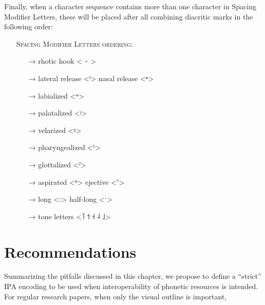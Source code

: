 Finally, when a character sequence contains more than one character in Spacing
Modifier Letters, these will be placed after all combining diacritic marks in the
following order:

\begin{itemize}
	\item[] \textsc{Spacing Modifier Letters ordering:}
	\begin{itemize}
	  \item[→] rhotic hook <{\large \ ˞} >
	  \item[→] lateral release <ˡ> \textbar{} nasal release <ⁿ>
	  \item[→] labialized <ʷ>
	  \item[→] palatalized <ʲ>
	  \item[→] velarized <ˠ>
	  \item[→] pharyngealized <ˤ>
	  \item[→] glottalized <ˀ>
	  \item[→] aspirated <ʰ> \textbar{} ejective <ʼ>
	  \item[→] long <ː> \textbar{} half-long <ˑ>
	  \item[→] tone letters <˥ ˦ ˧ ˨ ˩>
	\end{itemize}
\end{itemize}

\section{Recommendations}
\label{ipa-recommendations}

Summarizing the pitfalls discussed in this chapter, we propose to define a 
``strict'' IPA encoding to be used when interoperability of phonetic resources 
is intended. For regular research papers, when only the visual outline is 
important, 

  
 \label{tab:ipa_letters}
 \tabletail{\bottomrule}
  
